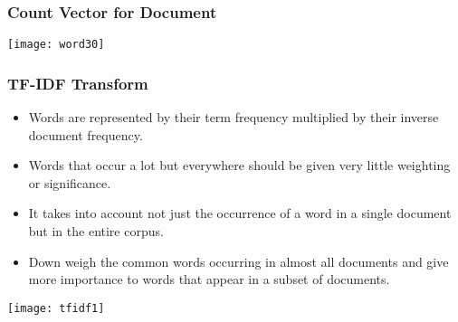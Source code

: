 \begin{frame}[fragile]\frametitle{Count Vector for Document}
\begin{center}
\texttt{[image: word30]}
\end{center}
\end{frame}







\begin{frame}[fragile]\frametitle{TF-IDF Transform}
  \begin{itemize}
	\item Words are represented by their term frequency multiplied by their inverse document frequency.
	\item Words that occur a lot but everywhere should be given very little weighting or significance. 
	\item It takes into account not just the occurrence of a word in a single document but in the entire corpus.
\item Down weigh the common words occurring in almost all documents and give more importance to words that appear in a subset of documents.
  \end{itemize}
  
\begin{center}
\texttt{[image: tfidf1]}
\end{center}

\end{frame}


